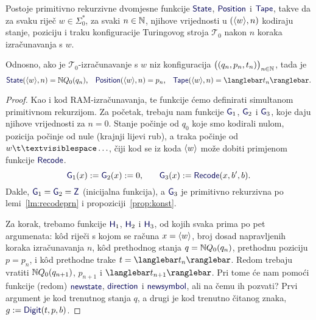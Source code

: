 \begin{lema}\label{lm:StateHeadTapeprn}
Postoje primitivno rekurzivne dvomjesne funkcije $\f{State}$, $\f{Position}$ i $\f{Tape}$, takve da za svaku riječ $w\in\Sigma_0^*$, za svaki $n\in{\mathbb N}$, njihove vrijednosti u $(\langle w\rangle,n)$ kodiraju stanje, poziciju i traku konfiguracije Turingovog stroja $\mathcal T_0$ nakon $n$ koraka izračunavanja s $w$.
\end{lema}
Odnosno, ako je $\mathcal T_0$-izračunavanje s $w$ niz konfiguracija $\bigl((q_n,p_n,t_n)\bigr)_{n\in{\mathbb N}}$, tada je
\begin{equation}
    \f{State}(\kr w,n)=\N Q_0(q_n)\text,\quad
    \f{Position}(\kr w,n)=p_n\text,\quad
    \f{Tape}(\kr w,n)=\knk{t_n}\text.
\end{equation}
\begin{proof}
Kao i kod RAM-izračunavanja, te funkcije ćemo definirati simultanom primitivnom rekurzijom. Za početak, trebaju nam funkcije $\f G_1$, $\f G_2$ i $\f G_3$, koje daju njihove vrijednosti za $n=0$. Stanje počinje od $q_0$ koje smo kodirali nulom, pozicija počinje od nule (krajnji lijevi rub), a traka počinje od $w\bl\ldots$, čiji kod se iz koda $\langle w\rangle$ može dobiti primjenom funkcije $\f{Recode}$.
\begin{equation}
    \f G_1(x):=\f G_2(x):=0\text,\qquad
    \f G_3(x):=\f{Recode}(x,b',b)\text.
\end{equation}
Dakle, $\f G_1=\f G_2=\f Z$ (inicijalna funkcija), a $\f G_3$ je primitivno rekurzivna po lemi~\ref{lm:recodeprn} i propoziciji~\ref{prop:konst}.

Za korak, trebamo funkcije $\f H_1$, $\f H_2$ i $\f H_3$, od kojih svaka prima po pet argumenata: k\^od riječi s kojom se računa $x=\langle w\rangle$, broj dosad napravljenih koraka izračunavanja $n$, k\^od prethodnog stanja $q={\mathbb N} Q_0(q_n)$, prethodnu poziciju $p=p_n$, i k\^od prethodne trake $t=\knk{t_n}$. Redom trebaju vratiti ${\mathbb N} Q_0(q_{n+1})$, $p_{n+1}$ i $\knk{t_{n+1}}$. Pri tome će nam pomoći funkcije (redom) $\f{newstate}$, $\f{direction}$ i $\f{newsymbol}$, ali na čemu ih pozvati? Prvi argument je kod trenutnog stanja $q$, a drugi je kod trenutno čitanog znaka, $g:=\f{Digit}(t,p,b)$.


\end{proof}
